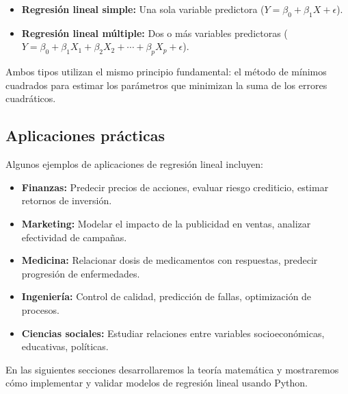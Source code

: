 \begin{itemize}
	\item \textbf{Regresión lineal simple:} Una sola variable predictora ($Y = \beta_0 + \beta_1 X + \epsilon$).
	\item \textbf{Regresión lineal múltiple:} Dos o más variables predictoras ($Y = \beta_0 + \beta_1 X_1 + \beta_2 X_2 + \cdots + \beta_p X_p + \epsilon$).
\end{itemize}

Ambos tipos utilizan el mismo principio fundamental: el método de mínimos cuadrados para estimar los parámetros que minimizan la suma de los errores cuadráticos.

\subsection{Aplicaciones prácticas}

Algunos ejemplos de aplicaciones de regresión lineal incluyen:

\begin{itemize}
	\item \textbf{Finanzas:} Predecir precios de acciones, evaluar riesgo crediticio, estimar retornos de inversión.
	\item \textbf{Marketing:} Modelar el impacto de la publicidad en ventas, analizar efectividad de campañas.
	\item \textbf{Medicina:} Relacionar dosis de medicamentos con respuestas, predecir progresión de enfermedades.
	\item \textbf{Ingeniería:} Control de calidad, predicción de fallas, optimización de procesos.
	\item \textbf{Ciencias sociales:} Estudiar relaciones entre variables socioeconómicas, educativas, políticas.
\end{itemize}

En las siguientes secciones desarrollaremos la teoría matemática y mostraremos cómo implementar y validar modelos de regresión lineal usando Python.

